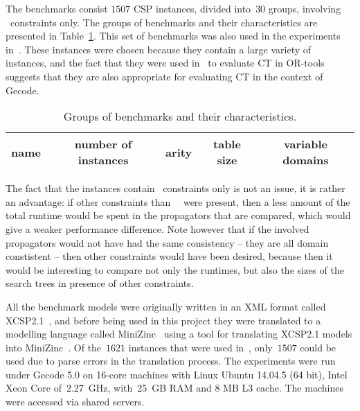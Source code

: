 \documentclass[a4paper,11pt]{article}
\newcommand{\Table}{\Constraint{Table}}
\newcommand{\CTpaper}[0]{DBLP:conf/cp/DemeulenaereHLP16}
\numberwithin{equation}{section}
\begin{document}
The benchmarks consist $1507$ CSP instances, divided into~$30$ groups,
involving \Table~constraints only.
The groups of benchmarks and their characteristics are presented in
Table~\ref{tab:benchmarks}. 
This set of benchmarks was also used in the
experiments in~\cite{\CTpaper}.
These instances were chosen because
they contain a large variety of instances,
and the fact that they were used in~\cite{\CTpaper}
to evaluate CT in OR-tools
suggests that they are also appropriate for evaluating CT
in the context of Gecode. 

\begin{table}[t]%
  \caption{Groups of benchmarks and their characteristics.}
  \label{tab:benchmarks}
  
  \begin{sideways}
    \centering
    \begin{tabular}{lcccc}  %
      name & number of instances & arity & table size & variable domains \\
      \midrule
       
    \end{tabular}
  \end{sideways}
\end{table}

The fact that the instances contain \Table~constraints only is not an
issue, it is rather an advantage: if other constraints than~\Table~
were present, then a less amount of the total runtime would be spent
in the propagators that are compared, which would give a weaker performance
difference.
Note however that if the involved propagators would not have had
the same consistency -- they are all domain constistent --
then other constraints would have been
desired, because then it would be interesting to compare
not only the runtimes, but also the sizes of the search trees
in presence of other constraints.

All the benchmark models were originally written in 
an XML format called 
XCSP2.1~\cite{DBLP:journals/corr/abs-0902-2362}, and before being used
in this project they were translated
to a modelling language called MiniZinc~\cite{MiniZinc} 
using a tool for translating XCSP2.1 models
into MiniZinc~\cite{xcsp2mzn}.
Of the~$1621$ instances that were used in~\cite{\CTpaper},
only~$1507$ could be used due to parse errors in the translation process.
The experiments were run
under Gecode 5.0 on 16-core machines with Linux Ubuntu 14.04.5 (64 bit),
Intel Xeon Core of~2.27~GHz, with~25~GB RAM and 8 MB L3 cache. The machines
were accessed via shared servers.
\end{document}
